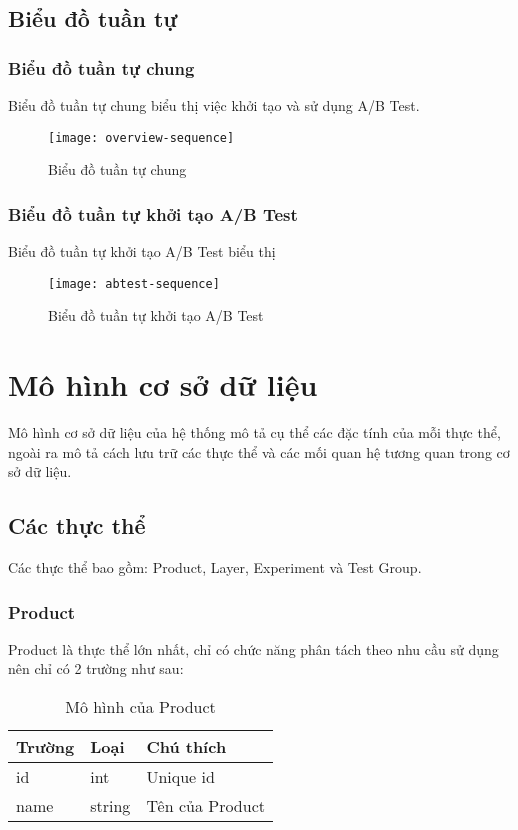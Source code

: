 \subsection{Biểu đồ tuần tự}

\subsubsection{Biểu đồ tuần tự chung}

Biểu đồ tuần tự chung biểu thị việc khởi tạo và sử dụng A/B Test.

\begin{figure}[H]
	\centering
	\texttt{[image: overview-sequence]}
	\caption{Biểu đồ tuần tự chung}
\end{figure}

\subsubsection{Biểu đồ tuần tự khởi tạo A/B Test}

Biểu đồ tuần tự khởi tạo A/B Test biểu thị

\begin{figure}[H]
	\centering
	\texttt{[image: abtest-sequence]}
	\caption{Biểu đồ tuần tự khởi tạo A/B Test}
\end{figure}

\section{Mô hình cơ sở dữ liệu}

Mô hình cơ sở dữ liệu của hệ thống mô tả cụ thể các đặc tính của mỗi thực thể, ngoài ra mô tả
cách lưu trữ các thực thể và các mối quan hệ tương quan trong cơ sở dữ liệu.

\subsection{Các thực thể}

Các thực thể bao gồm: Product, Layer, Experiment và Test Group.

\subsubsection{Product}

Product là thực thể lớn nhất, chỉ có chức năng phân tách theo nhu cầu sử dụng nên chỉ có 2 trường như sau:
\begin{table}[H]
	\centering
	\begin{tabular}{|l|l|l|}
		\hline
		Trường & Loại   & Chú thích       \\ \hline
		id     & int    & Unique id       \\ \hline
		name   & string & Tên của Product \\ \hline
	\end{tabular}
	\caption{Mô hình của Product}
\end{table}

